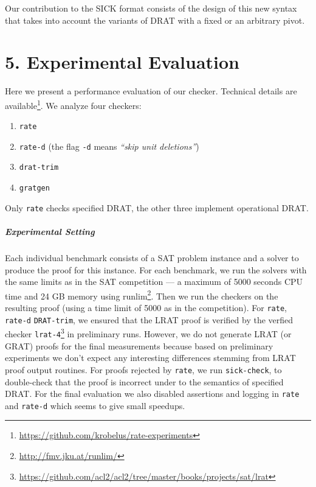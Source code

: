 \documentclass[
]{report}
\providecommand{\tightlist}{%
  \setlength{\itemsep}{0pt}\setlength{\parskip}{0pt}}
\begin{document}
Our contribution to the SICK format consists of the design of this new
syntax that takes into account the variants of DRAT with a fixed or an
arbitrary pivot.

\hypertarget{experimental-evaluation}{%
\chapter{5. Experimental Evaluation}\label{experimental-evaluation}}

Here we present a performance evaluation of our checker. Technical
details are available\footnote{\url{https://github.com/krobelus/rate-experiments}}.
We analyze four checkers:

\begin{enumerate}
\def\labelenumi{\arabic{enumi}.}
\tightlist
\item
  \texttt{rate}
\item
  \texttt{rate-d} \hfill (the flag \texttt{-d} means \emph{``skip unit
  deletions''})
\item
  \texttt{drat-trim}
\item
  \texttt{gratgen}
\end{enumerate}

Only \texttt{rate} checks specified DRAT, the other three implement
operational DRAT.

\paragraph{Experimental Setting}

Each individual benchmark consists of a SAT problem instance and a
solver to produce the proof for this instance. For each benchmark, we
run the solvers with the same limits as in the SAT competition --- a
maximum of 5000 seconds CPU time and 24 GB memory using runlim\footnote{\url{http://fmv.jku.at/runlim/}}.
Then we run the checkers on the resulting proof (using a time limit of
5000 as in the competition). For \texttt{rate}, \texttt{rate-d}
\texttt{DRAT-trim}, we ensured that the LRAT proof is verified by the
verfied checker \texttt{lrat-4}\footnote{\url{https://github.com/acl2/acl2/tree/master/books/projects/sat/lrat}}
in preliminary runs. However, we do not generate LRAT (or GRAT) proofs
for the final measurements because based on preliminary experiments we
don't expect any interesting differences stemming from LRAT proof output
routines. For proofs rejected by \texttt{rate}, we run
\texttt{sick-check}, to double-check that the proof is incorrect under
to the semantics of specified DRAT. For the final evaluation we also
disabled assertions and logging in \texttt{rate} and \texttt{rate-d}
which seems to give small speedups.
\end{document}
